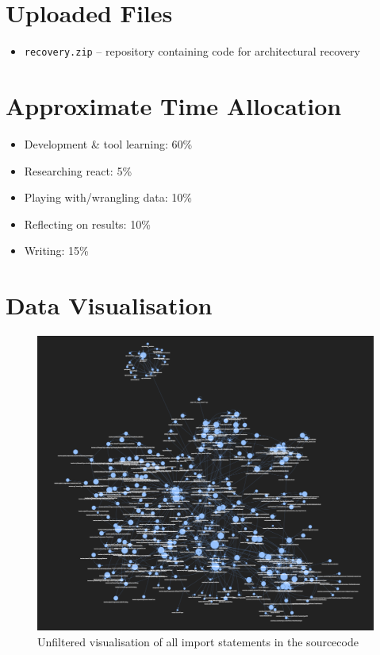 \documentclass{article}
\begin{document}
\clearpage
\section{Uploaded Files}
\label{apx:b}
\begin{itemize}
  \item \verb|recovery.zip| -- repository containing code for architectural recovery
\end{itemize}

\clearpage
\section{Approximate Time Allocation}
\label{apx:c}
\begin{itemize}
  \item Development \& tool learning: 60\%
  \item Researching react: 5\%
  \item Playing with/wrangling data: 10\%
  \item Reflecting on results: 10\%
  \item Writing: 15\%
\end{itemize}

\clearpage
\section{Data Visualisation}
\label{apx:d}

\begin{figure}[h]
\includegraphics[width=\textwidth]{graphics/raw_imports.png}
\caption{Unfiltered visualisation of all import statements in the sourcecode}
\label{fig:d:raw}
\end{figure}
\end{document}
